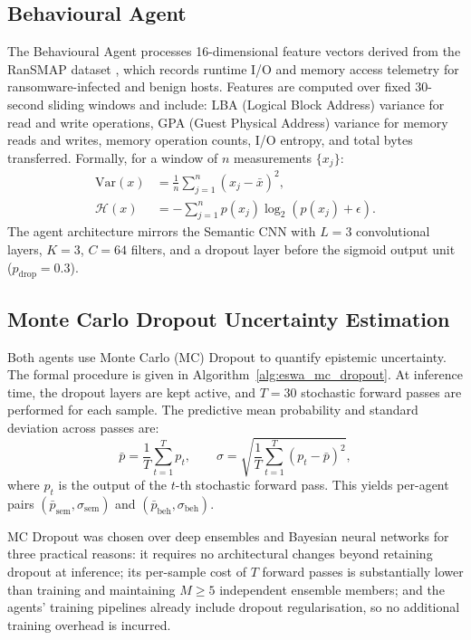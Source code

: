 \subsection{Behavioural Agent}

The Behavioural Agent processes 16-dimensional feature vectors derived from the RanSMAP dataset \cite{hirano2022ransap, hirano2025ransmap}, which records runtime I/O and memory access telemetry for ransomware-infected and benign hosts. Features are computed over fixed 30-second sliding windows and include: LBA (Logical Block Address) variance for read and write operations, GPA (Guest Physical Address) variance for memory reads and writes, memory operation counts, I/O entropy, and total bytes transferred. Formally, for a window of $n$ measurements $\{x_j\}$:
\begin{align}
\text{Var}(x) &= \frac{1}{n}\sum_{j=1}^n (x_j - \bar{x})^2, \\
\mathcal{H}(x) &= -\sum_{j=1}^n p(x_j)\log_2(p(x_j) + \epsilon).
\end{align}
The agent architecture mirrors the Semantic CNN with $L = 3$ convolutional layers, $K = 3$, $C = 64$ filters, and a dropout layer before the sigmoid output unit ($p_\text{drop} = 0.3$).

\subsection{Monte Carlo Dropout Uncertainty Estimation}

Both agents use Monte Carlo (MC) Dropout \cite{gal2016dropout} to quantify epistemic uncertainty. The formal procedure is given in Algorithm~\ref{alg:eswa_mc_dropout}. At inference time, the dropout layers are kept active, and $T = 30$ stochastic forward passes are performed for each sample. The predictive mean probability and standard deviation across passes are:
\begin{equation}
\bar{p} = \frac{1}{T}\sum_{t=1}^T p_t, \qquad
\sigma = \sqrt{\frac{1}{T}\sum_{t=1}^T (p_t - \bar{p})^2},
\label{eq:eswa_mcdropout}
\end{equation}
where $p_t$ is the output of the $t$-th stochastic forward pass. This yields per-agent pairs $(\bar{p}_\text{sem}, \sigma_\text{sem})$ and $(\bar{p}_\text{beh}, \sigma_\text{beh})$.

MC Dropout was chosen over deep ensembles and Bayesian neural networks for three practical reasons: it requires no architectural changes beyond retaining dropout at inference; its per-sample cost of $T$ forward passes is substantially lower than training and maintaining $M \geq 5$ independent ensemble members; and the agents' training pipelines already include dropout regularisation, so no additional training overhead is incurred.

